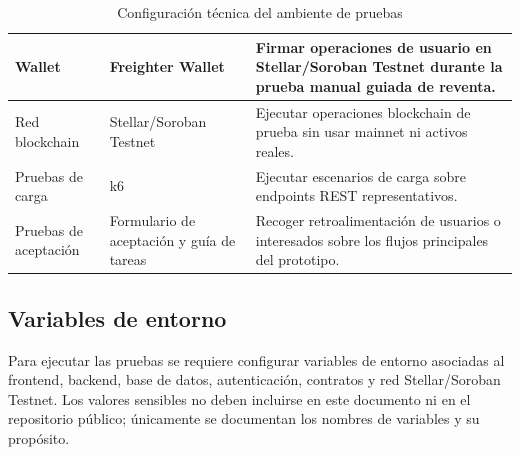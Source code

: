 \documentclass[12pt,letterpaper]{article}
\begin{document}
\begin{table}[H]
\begin{tabularx}{\textwidth}{|
>{\raggedright\arraybackslash}p{3.4cm}|
>{\raggedright\arraybackslash}p{4.7cm}|
>{\raggedright\arraybackslash}X|}
Wallet &
Freighter Wallet &
Firmar operaciones de usuario en Stellar/Soroban Testnet durante la prueba manual guiada de reventa. \\
\hline

Red blockchain &
Stellar/Soroban Testnet &
Ejecutar operaciones blockchain de prueba sin usar mainnet ni activos reales. \\
\hline

Pruebas de carga &
k6 &
Ejecutar escenarios de carga sobre endpoints REST representativos. \\
\hline

Pruebas de aceptación &
Formulario de aceptación y guía de tareas &
Recoger retroalimentación de usuarios o interesados sobre los flujos principales del prototipo. \\
\hline

\end{tabularx}

\endgroup

\caption{Configuración técnica del ambiente de pruebas}
\label{tab:configuracion-tecnica-pruebas}
\end{table}

\subsection{Variables de entorno}

Para ejecutar las pruebas se requiere configurar variables de entorno asociadas al frontend, backend, base de datos, autenticación, contratos y red Stellar/Soroban Testnet. Los valores sensibles no deben incluirse en este documento ni en el repositorio público; únicamente se documentan los nombres de variables y su propósito.
\end{document}
